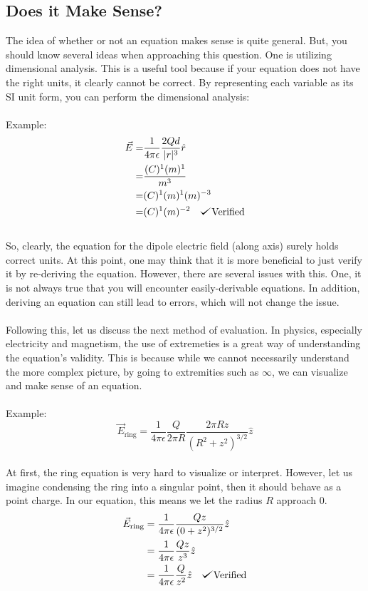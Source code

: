 \documentclass{article}
\def\checkmark{\tikz\fill[scale=0.4](0,.35) -- (.25,0) -- (1,.7) -- (.25,.15) -- cycle;}
\begin{document}
\subsection{Does it Make Sense?}
The idea of whether or not an equation makes sense is quite general. But, you should know several ideas when approaching this question. One is utilizing dimensional analysis. This is a useful tool because if your equation does not have the right units, it clearly cannot be correct. By representing each variable as its SI unit form, you can perform the dimensional analysis:\\
\\
Example:
\begin{align*}
	\vec{E} =& \frac{1}{4\pi\epsilon}\frac{2Qd}{|r|^3}\hat{r}\\
	=& \frac{(C)^1(m)^1}{m^3}\\
	=& (C)^1(m)^1(m)^{-3}\\
	=& (C)^1(m)^{-2} \ \ \ \checkmark \text{Verified}
\end{align*}\\
So, clearly, the equation for the dipole electric field (along axis) surely holds correct units. At this point, one may think that it is more beneficial to just verify it by re-deriving the equation. However, there are several issues with this. One, it is not always true that you will encounter easily-derivable equations. In addition, deriving an equation can still lead to errors, which will not change the issue. \\
\\
Following this, let us discuss the next method of evaluation. In physics, especially electricity and magnetism, the use of extremeties is a great way of understanding the equation's validity. This is because while we cannot necessarily understand the more complex picture, by going to extremities such as $\infty$, we can visualize and make sense of an equation.\\
\\
Example:
\begin{equation*}
	\vec{E}_{\text{ring}} = \frac{1}{4\pi\epsilon}\frac{Q}{2\pi R}\frac{2\pi R z}{(R^2 + z^2)^{3/2}}\hat{z}
\end{equation*}\\
At first, the ring equation is very hard to visualize or interpret. However, let us imagine condensing the ring into a singular point, then it should behave as a point charge. In our equation, this means we let the radius $R$ approach $0$.\\
\begin{align*}
	\vec{E}_{\text{ring}} &= \frac{1}{4\pi\epsilon}\frac{Qz}{(0 + z^2)^{3/2}}\hat{z}\\
	&= \frac{1}{4\pi\epsilon}\frac{Qz}{z^3}\hat{z}\\
	&= \frac{1}{4\pi\epsilon}\frac{Q}{z^2}\hat{z} \ \ \ \checkmark \text{Verified}
\end{align*}
\end{document}
